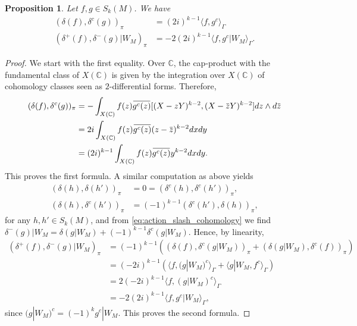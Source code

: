 \documentclass[10pt,a4paper]{amsart}
\newtheorem{proposition}{Proposition}
\newcommand\bC{\mathbb{C}}
\newcommand{\ob}[1]{\mkern 1.5mu\overline{\mkern-1.5mu#1\mkern-1.5mu}\mkern 1.5mu}
\begin{document}
\begin{proposition}\label{prop:calcul_poincare_pairing}
	Let $f,g\in S_k(M)$. We have 
	\begin{align*}
		(\delta(f),\delta^c(g))_\pi&= (2i)^{k-1}\langle f,g^c\rangle_\Gamma \\
		(\delta^+(f),\delta^-(g)|W_M)_\pi&=-2(2i)^{k-1}\langle f,g^c|W_M\rangle_\Gamma.
	\end{align*}
\end{proposition}

\begin{proof}
	We start with the first equality. Over $\bC$, the cap-product with the fundamental class of $X(\bC)$ is given by the integration over $X(\bC)$ of cohomology classes seen as $2$-differential forms. Therefore,
	\begin{align*}
		(\delta(f),\delta^c(g))_\pi &= - \int_{X(\bC)}   f(z)\ob{g^c(z)} [(X-zY)^{k-2},(X-\ob{z}Y)^{k-2}] dz\wedge d\ob{z} \\
		&= 2i \int_{X(\bC)} f(z)\ob{g^c(z)}(z-\ob{z})^{k-2} dxdy \\
		&=(2i)^{k-1}\int_{X(\bC)} f(z)\ob{g^c(z)}y^{k-2} dxdy.
	\end{align*}
This proves the first formula. A similar computation as above yields \small
\begin{align*}
	(\delta(h),\delta(h'))_\pi&=0=(\delta^c(h),\delta^c(h'))_\pi, \\  (\delta(h),\delta^c(h'))_\pi&=(-1)^{k-1}(\delta^c(h'),\delta(h))_\pi,
\end{align*}
\normalsize for any $h,h'\in S_k(M)$, and from \eqref{eq:action_slash_cohomology} we find $\delta^-(g)|W_M=\delta(g|W_M)+(-1)^{k-1}\delta^c(g|W_M)$. Hence, by linearity,
\begin{align*}
	(\delta^+(f),\delta^-(g)|W_M)_\pi&= (-1)^{k-1} \left( (\delta(f),\delta^c(g|W_M))_\pi + (\delta(g|W_M),\delta^c(f))_\pi \right) \\
									&=(-2i)^{k-1}\left(\langle f,(g|W_M)^c\rangle_\Gamma+\langle g|W_M,f^c\rangle_\Gamma\right) \\
									&= 2(-2i)^{k-1}\langle f,(g|W_M)^c\rangle_\Gamma \\
									&=-2(2i)^{k-1}\langle f,g^c|W_M\rangle_\Gamma,
\end{align*}
since $(g|W_M)^c=(-1)^kg^c|W_M$. This proves the second formula.
\end{proof}
\end{document}
